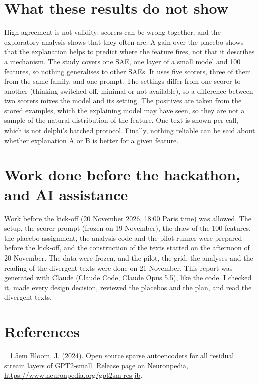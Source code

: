 \documentclass[11pt]{article}
\newcommand{\bibentree}[1]{\par\noindent\hangindent=1.5em\hangafter=1 #1\par\vspace{0.5em}}
\begin{document}
\section*{What these results do not show}

High agreement is not validity: scorers can be wrong together, and the exploratory
analysis shows that they often are. A gain over the placebo shows that the explanation
helps to predict where the feature fires, not that it describes a mechanism. The study
covers one SAE, one layer of a small model and 100 features, so nothing generalises to
other SAEs. It uses five scorers, three of them from the same family, and one prompt.
The settings differ from one scorer to another (thinking switched off, minimal or not
available), so a difference between two scorers mixes the model and its setting. The
positives are taken from the stored examples, which the explaining model may have seen,
so they are not a sample of the natural distribution of the feature. One text is shown
per call, which is not delphi's batched protocol. Finally, nothing reliable can be said
about whether explanation A or B is better for a given feature.

\section*{Work done before the hackathon, and AI assistance}

Work before the kick-off (20 November 2026, 18:00 Paris time) was allowed. The setup,
the scorer prompt (frozen on 19 November), the draw of the 100 features, the placebo
assignment, the analysis code and the pilot runner were prepared before the kick-off,
and the construction of the texts started on the afternoon of 20 November. The data
were frozen, and the pilot, the grid, the analyses and the reading of the divergent
texts were done on 21 November. This report was generated with Claude (Claude Code,
Claude Opus 5.5), like the code. I checked it, made every design decision, reviewed the
placebos and the plan, and read the divergent texts.

\section*{References}

\bibentree{Bloom, J. (2024). Open source sparse autoencoders for all residual stream
layers of GPT2-small. Release page on Neuronpedia,
\url{https://www.neuronpedia.org/gpt2sm-res-jb}.}
\end{document}
